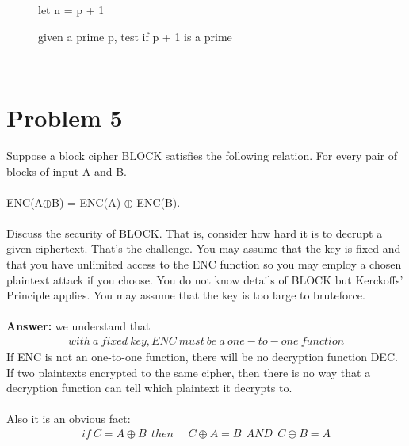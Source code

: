 \documentclass[12pt,letterpaper]{article}
\begin{document}
\begin{enumerate}
\begin{figure}[ht]
      \centering
      \begin{minipage}{.7\linewidth}
        \begin{algorithm}[H]
        \SetAlgoLined
          let n = p + 1\;
         \caption{given a prime p, test if p + 1 is a prime}
        \end{algorithm}
      \end{minipage}
    \end{figure} \\

\end{enumerate}

\section*{Problem 5}
\setcounter{equation}{0}

Suppose a block cipher BLOCK satisfies the following relation.  For every pair of blocks of input A and B.  
\\\\
ENC(A$\oplus$B) = ENC(A) $\oplus$ ENC(B).
\\\\
Discuss the security of BLOCK. That is, consider how hard it is to decrupt a given ciphertext.  That's the challenge.  You may assume that the key is fixed and that you have unlimited access to the ENC function so you may employ a chosen plaintext attack if you choose.  You do not know details of BLOCK but Kerckoffs' Principle applies. You may assume that the key is too large to bruteforce.
\\\\
\textbf{Answer:} we understand that 
\begin{align}
  with \ a \ fixed \ key, ENC \ must \ be \ a \ one-to-one \ function
\end{align}
If ENC is not an one-to-one function, there will be no decryption function DEC.  If two plaintexts encrypted to the same cipher, then there is no way that a decryption function can tell which plaintext it decrypts to.
\\\\
Also it is an obvious fact:
\begin{align}
  if \ C = A \oplus B  \ \ then \ \ \ \ \ \ C \oplus A = B \ \ AND \  \  C \oplus B = A
\end{align}
\end{document}

